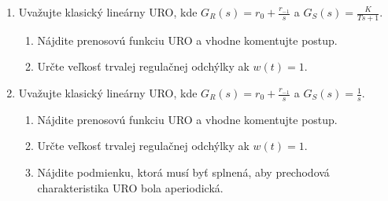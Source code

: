 \documentclass[a4paper, 10pt, ]{article}
\begin{document}
\begin{enumerate}[leftmargin=0pt, labelsep=3mm, itemsep=0pt]
    \item Uvažujte klasický lineárny URO, kde $\displaystyle G_R(s) = r_0 + \frac{r_{-1}}{s}$ a $\displaystyle G_S(s) = \frac{K}{Ts + 1}$.
    \begin{enumerate}
        \item Nájdite prenosovú funkciu URO a vhodne komentujte postup.
        \item Určte veľkosť trvalej regulačnej odchýlky ak $w(t) = 1$.
    \end{enumerate}

    \item Uvažujte klasický lineárny URO, kde $\displaystyle G_R(s) = r_0 + \frac{r_{-1}}{s}$ a $\displaystyle G_S(s) = \frac{1}{s}$.
    \begin{enumerate}
        \item Nájdite prenosovú funkciu URO a vhodne komentujte postup.
        \item Určte veľkosť trvalej regulačnej odchýlky ak $w(t) = 1$.
        \item Nájdite podmienku, ktorá musí byť splnená, aby prechodová charakteristika URO bola aperiodická.
    \end{enumerate}






\end{enumerate}








































% 
\end{document}
